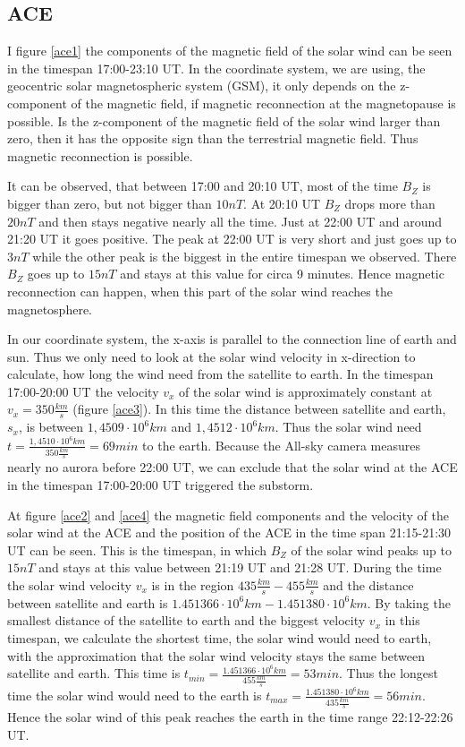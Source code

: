 \documentclass[10pt,a4paper]{article}
\begin{document}
\subsection{ACE}

I figure \ref{ace1} the components of the magnetic field of the solar wind can be seen in the timespan 17:00-23:10 UT. In the coordinate system, we are using, the geocentric solar magnetospheric system (GSM), it only depends on the z-component of the magnetic field, if magnetic reconnection at the magnetopause is possible. Is the z-component of the magnetic field of the solar wind larger than zero, then it has the opposite sign than the terrestrial magnetic field. Thus magnetic reconnection is possible. 

It can be observed, that between 17:00 and 20:10 UT, most of the time $B_Z$ is bigger than zero, but not bigger than $10 nT$. At 20:10 UT $B_Z$ drops more than $20 nT$ and then stays negative nearly all the time. Just at 22:00 UT and around 21:20 UT it goes positive. The peak at 22:00 UT is very short and just goes up to $3 nT$ while the other peak is the biggest in the entire timespan we observed. There $B_Z$ goes up to $15 nT$ and stays at this value for circa 9 minutes. Hence magnetic reconnection can happen, when this part of the solar wind reaches the magnetosphere.

In our coordinate system, the x-axis is parallel to the connection line of earth and sun. Thus we only need to look at the solar wind velocity in x-direction to calculate, how long the wind need from the satellite to earth.
In the timespan 17:00-20:00 UT the velocity $v_x$ of the solar wind is approximately constant at $v_x = 350 \frac{km}{s}$ (figure \ref{ace3}). In this time the distance between satellite and earth, $s_x$, is between $1,4509 \cdot 10^6 km$ and $1,4512 \cdot 10^6 km$. Thus the solar wind need $t = \frac{1,4510 \cdot 10^6 km}{350 \frac{km}{s}} = 69 min$ to the earth. Because the All-sky camera measures nearly no aurora before 22:00 UT, we can exclude that the solar wind at the ACE in the timespan 17:00-20:00 UT triggered the substorm.

At figure \ref{ace2} and \ref{ace4} the magnetic field components and the velocity of the solar  wind at the ACE and the position of the ACE in the time span 21:15-21:30 UT can be seen. This is the timespan, in which $B_Z$ of the solar wind peaks up to $15 nT$ and stays at this value between 21:19 UT and 21:28 UT. During the time the solar wind velocity $v_x$ is in the region $435 \frac{km}{s}-455 \frac{km}{s}$ and the distance between satellite and earth is $1.451366 \cdot 10^6 km - 1.451380 \cdot 10^6 km$. By taking the smallest distance of the satellite to earth and the biggest velocity $v_x$ in this timespan, we calculate the shortest time, the solar wind would need to earth, with the approximation that the solar wind velocity stays the same between satellite and earth. This time is $t_{min} = \frac{1.451366 \cdot 10^6 km}{455 \frac{km}{s}} = 53 min$. Thus the longest time the solar wind would need to the earth is $t_{max} = \frac{1.451380 \cdot 10^6 km}{435 \frac{km}{s}} = 56 min$. Hence the solar wind of this peak reaches the earth in the time range 22:12-22:26 UT.
\end{document}
